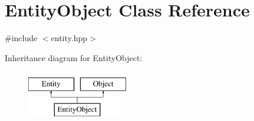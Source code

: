 \hypertarget{class_entity_object}{}\section{Entity\+Object Class Reference}
\label{class_entity_object}


{\ttfamily \#include $<$entity.\+hpp$>$}

Inheritance diagram for Entity\+Object\+:\begin{figure}[H]
\begin{center}
\leavevmode
\includegraphics[height=2.000000cm]{class_entity_object}
\end{center}
\end{figure}

